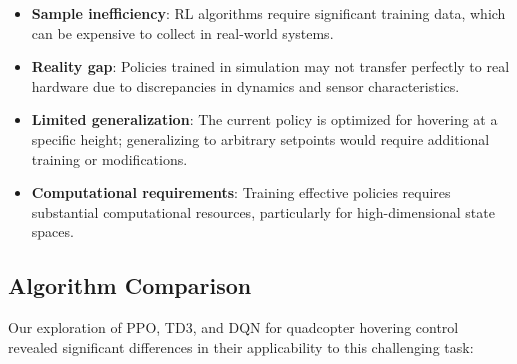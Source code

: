 \documentclass[12pt]{article}
\begin{document}
\begin{itemize}
    \item \textbf{Sample inefficiency}: RL algorithms require significant training data, which can be expensive to collect in real-world systems.
    
    \item \textbf{Reality gap}: Policies trained in simulation may not transfer perfectly to real hardware due to discrepancies in dynamics and sensor characteristics.
    
    \item \textbf{Limited generalization}: The current policy is optimized for hovering at a specific height; generalizing to arbitrary setpoints would require additional training or modifications.
    
    \item \textbf{Computational requirements}: Training effective policies requires substantial computational resources, particularly for high-dimensional state spaces.
\end{itemize}

%     
%     
%     

\subsection{Algorithm Comparison}

Our exploration of PPO, TD3, and DQN for quadcopter hovering control revealed significant differences in their applicability to this challenging task:

\end{document}
